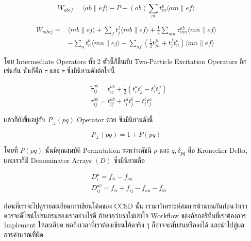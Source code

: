 \begin{equation}
  \label{eq:W_abef}
  W_{a b e f}=\langle a b \| e f\rangle-P-(a b) \sum_m t_m^b\langle a m \| e f\rangle
\end{equation}

\begin{equation}
  \label{eq:W_mbej}
  \begin{aligned}
    W_{m b e j}
    =
     & \langle m b \| e j\rangle+\sum_f t_j^f\langle m b \| e f\rangle
    + \frac{1}{4} \sum_{m n} \tau_{m n}^{a b}\langle m n \| e f\rangle \\
     & - \sum_n t_n^b\langle m n \| e j\rangle
    - \sum_{n f}\left(\frac{1}{2} t_{j n}^{f b}+t_j^f t_n^b\right)\langle m n \| e f\rangle
  \end{aligned}
\end{equation}

\noindent โดย Intermediate Operators ทั้ง 2 ตัวนี้ก็ขึ้นกับ Two-Particle Excitation Operators อีกเช่นกัน นั่นก็คือ $\tau$
และ $\tilde{\tau}$ ซึ่งมีนิยามดังต่อไปนี้

\begin{align}
  \label{eq:tau_abij_tilde}
   & \tilde{\tau}_{i j}^{a b}
  =
  t_{i j}^{a b}+\frac{1}{2}\left(t_i^a t_j^b-t_i^b t_j^a\right) \\
  \label{eq:tau_abij}
   & \tau_{i j}^{a b}
  =
  t_{i j}^{a b}+t_i^a t_j^b-t_i^b t_j^a
\end{align}

\noindent แล้วก็ยังขึ้นอยู่กับ $P_{ \pm}(p q)$ Operator ด้วย ซึ่งมีนิยามดังนี้

\begin{equation}
  P_{ \pm}(p q)
  =
  1 \pm P(p q)
\end{equation}

\noindent โดยที่ $P(p q)$ นั้นมีคุณสมบัติ Permutation ระหว่างดัชนี $p$ และ $q, \delta_{p q}$ คือ Kronecker
Delta, และเราก็มี Denominator Arrays $(D)$ ซึ่งมีนิยามคือ

\begin{align}
  \label{eq:D_ai}
   & D_i^a
  =
  f_{i i}-f_{a a}  \\
  \label{eq:D_abij}
   & D_{i j}^{a b}
  =
  f_{i i}+f_{i j}-f_{a a}-f_{b b}
\end{align}

ก่อนที่เราจะไปดูรายละเอียดการเขียนโค้ดของ CCSD นั้น เรามาวิเคราะห์สมการด้านบนกันก่อนว่าเราควรจะดีไซน์โปรแกรมของเราอย่างไรดี
ถ้าหากว่าเราไม่เข้าใจ Workflow ของอัลกอริทึมที่เราต้องการ Implement ให้ละเอียด พอถึงเวลาที่เราต้องเขียนโค้ดจริง ๆ ก็อาจจะสับสนหรืองงได้
และนำไปสู่ผลการคำนวณที่ผิด


